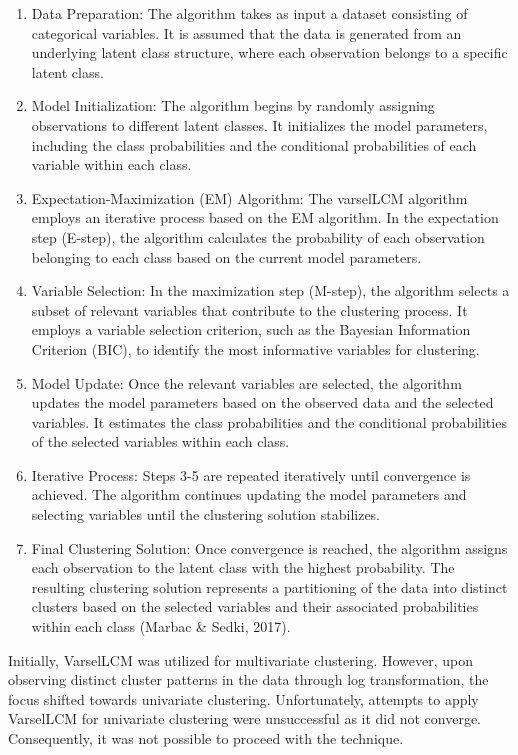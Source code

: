 \documentclass[11pt, a4paper]{article}
\begin{document}
\begin{enumerate}
\item Data Preparation: The algorithm takes as input a dataset consisting of categorical variables. It is assumed that the data is generated from an underlying latent class structure, where each observation belongs to a specific latent class.
\item Model Initialization: The algorithm begins by randomly assigning observations to different latent classes. It initializes the model parameters, including the class probabilities and the conditional probabilities of each variable within each class.
\item Expectation-Maximization (EM) Algorithm: The varselLCM algorithm employs an iterative process based on the EM algorithm. In the expectation step (E-step), the algorithm calculates the probability of each observation belonging to each class based on the current model parameters.
\item Variable Selection: In the maximization step (M-step), the algorithm selects a subset of relevant variables that contribute to the clustering process. It employs a variable selection criterion, such as the Bayesian Information Criterion (BIC), to identify the most informative variables for clustering.
\item Model Update: Once the relevant variables are selected, the algorithm updates the model parameters based on the observed data and the selected variables. It estimates the class probabilities and the conditional probabilities of the selected variables within each class.
\item Iterative Process: Steps 3-5 are repeated iteratively until convergence is achieved. The algorithm continues updating the model parameters and selecting variables until the clustering solution stabilizes.
\item Final Clustering Solution: Once convergence is reached, the algorithm assigns each observation to the latent class with the highest probability. The resulting clustering solution represents a partitioning of the data into distinct clusters based on the selected variables and their associated probabilities within each class (Marbac \& Sedki, 2017).
\end{enumerate}

Initially, VarselLCM was utilized for multivariate clustering. However, upon observing distinct cluster patterns in the data through log transformation, the focus shifted towards univariate clustering. Unfortunately, attempts to apply VarselLCM for univariate clustering were unsuccessful as it did not converge. Consequently, it was not possible to proceed with the technique. 
\end{document}
